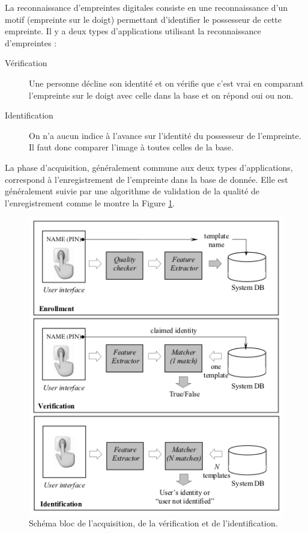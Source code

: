 La reconnaissance d'empreintes digitales consiste en une
reconnaissance d'un motif (empreinte sur le doigt) permettant
d'identifier le possesseur de cette empreinte. Il y a deux types
d'applications utilisant la reconnaissance d'empreintes :

\begin{description}
\item[Vérification] Une personne décline son identité et on vérifie
  que c'est vrai en comparant l'empreinte sur le doigt avec celle dans
  la base et on répond oui ou non.
\item[Identification] On n'a aucun indice à l'avance sur l'identité du
  possesseur de l'empreinte. Il faut donc comparer l'image à toutes
  celles de la base.
\end{description}

La phase d'acquisition, généralement commune aux deux types
d'applications, correspond à l'enregistrement de l'empreinte dans la
base de donnée. Elle est généralement suivie par une algorithme de
validation de la qualité de l'enregistrement comme le montre la Figure
\ref{fig:schema-bloc-acq}.

\begin{figure}[H]
\centering
\includegraphics[scale=0.8]{three_way.png}
\caption{Schéma bloc de l'acquisition, de la vérification et de
  l'identification.}
\label{fig:schema-bloc-acq}
\end{figure}


